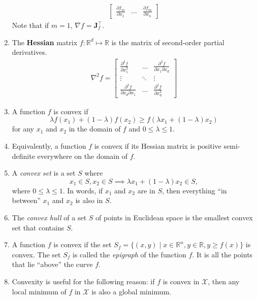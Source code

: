 \documentclass[10pt]{article}
\begin{document}
\begin{multicols}{2}
\begin{addmargin}[0.8em]{0.5em}
\begin{enumerate}[label=(\alph*)]
\begin{align*}
\begin{bmatrix}
        \frac{\partial f_m}{\partial x_1} & \hdots & \frac{\partial f_m}{\partial x_n}
        \end{bmatrix}
        \end{align*}
        Note that if $m=1$, $\nabla f = \mathbf{J}_f^\top$.
        \item The \textbf{Hessian} matrix $f: \mathbb{R}^d \mapsto \mathbb{R}$ is the matrix of second-order partial derivatives.
        \begin{align*}
        \nabla^2 f =
        \begin{bmatrix}
        \frac{\partial^2 f}{\partial x_1^2} & \hdots & \frac{\partial^2 f}{\partial x_1 \partial x_d} \\
        \vdots & \ddots & \vdots \\
        \frac{\partial^2 f}{\partial x_d \partial x_1} & \hdots & \frac{\partial^2 f}{\partial x_d^2}
        \end{bmatrix}
        \end{align*}
    
    	\item A function $f$ is convex if $$\lambda f(x_1) + (1 - \lambda) f(x_2) \geq f(\lambda x_1 + (1-\lambda) x_2)$$ for any $x_1$ and $x_2$ in the domain of $f$ and $0 \leq \lambda \leq 1$.
    	
    	\item Equivalently, a function $f$ is convex if its Hessian matrix is positive semi-definite everywhere on the domain of $f$. 
        
        \item A \textit{convex set} is a set $S$ where $$x_1 \in S, x_2 \in S \implies \lambda x_1 + (1 - \lambda) x_2 \in S,$$ where $0 \leq \lambda \leq 1$. In words, if $x_1$ and $x_2$ are in $S$, then everything ``in between'' $x_1$ and $x_2$ is also in $S$.
        
        \item The \textit{convex hull} of a set $S$ of points in Euclidean space is the smallest convex set that contains $S$. 
        
    	\item A function $f$ is convex if the set $S_f = \{(x, y) \mid x \in \mathbb{R}^n, y \in \mathbb{R}, y \geq f(x)\}$ is convex. The set $S_f$ is called the \emph{epigraph} of the function $f$. It is all the points that lie ``above'' the curve $f$.
    	
    	\item Convexity is useful for the following reason: if $f$ is convex in $\mathcal{X}$, then any local minimum of $f$ in $\mathcal{X}$ is also a global minimum.    	
        

\end{enumerate}
\end{addmargin}
\end{multicols}
\end{document}
